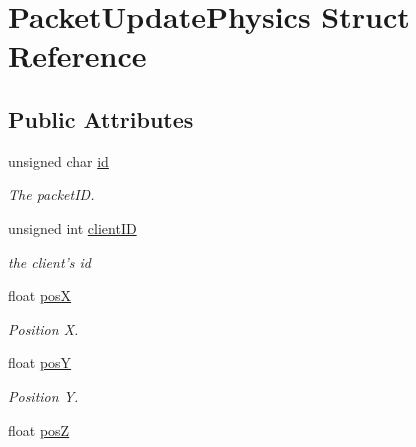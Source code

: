\hypertarget{struct_packet_update_physics}{\section{Packet\-Update\-Physics Struct Reference}
\label{struct_packet_update_physics}
}
\subsection*{Public Attributes}
\begin{DoxyCompactItemize}
\item 
\hypertarget{struct_packet_update_physics_ae09f672cd718adfd2d9a52e3a6050abf}{unsigned char \hyperlink{struct_packet_update_physics_ae09f672cd718adfd2d9a52e3a6050abf}{id}}\label{struct_packet_update_physics_ae09f672cd718adfd2d9a52e3a6050abf}

\begin{DoxyCompactList}\small\item\em The packet\-I\-D. \end{DoxyCompactList}\item 
\hypertarget{struct_packet_update_physics_a1283bfc7624d2a35cd22f8a402b6998d}{unsigned int \hyperlink{struct_packet_update_physics_a1283bfc7624d2a35cd22f8a402b6998d}{client\-I\-D}}\label{struct_packet_update_physics_a1283bfc7624d2a35cd22f8a402b6998d}

\begin{DoxyCompactList}\small\item\em the client's id \end{DoxyCompactList}\item 
\hypertarget{struct_packet_update_physics_a1d9618a795857aab77f183d90ed4e9c5}{float \hyperlink{struct_packet_update_physics_a1d9618a795857aab77f183d90ed4e9c5}{pos\-X}}\label{struct_packet_update_physics_a1d9618a795857aab77f183d90ed4e9c5}

\begin{DoxyCompactList}\small\item\em Position X. \end{DoxyCompactList}\item 
\hypertarget{struct_packet_update_physics_aca930e7b03bfe19b9d9ab973a09c1d42}{float \hyperlink{struct_packet_update_physics_aca930e7b03bfe19b9d9ab973a09c1d42}{pos\-Y}}\label{struct_packet_update_physics_aca930e7b03bfe19b9d9ab973a09c1d42}

\begin{DoxyCompactList}\small\item\em Position Y. \end{DoxyCompactList}\item 
\hypertarget{struct_packet_update_physics_a30b73ea55e9f5dff1cbcdacea1113385}{float \hyperlink{struct_packet_update_physics_a30b73ea55e9f5dff1cbcdacea1113385}{pos\-Z}}\label{struct_packet_update_physics_a30b73ea55e9f5dff1cbcdacea1113385}


\end{DoxyCompactItemize}
